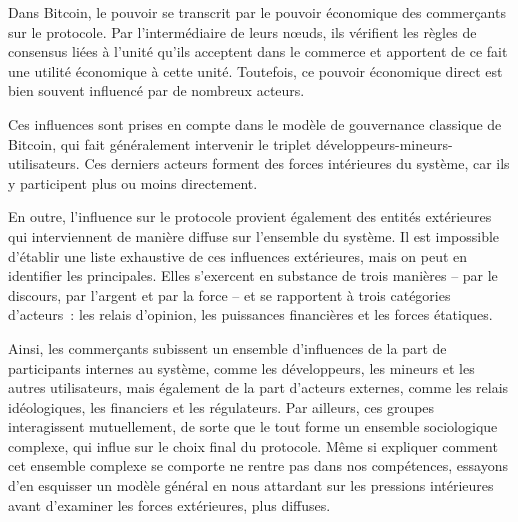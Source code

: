 Dans Bitcoin, le pouvoir se transcrit par le pouvoir économique des commerçants sur le protocole. Par l'intermédiaire de leurs nœuds, ils vérifient les règles de consensus liées à l'unité qu'ils acceptent dans le commerce et apportent de ce fait une utilité économique à cette unité. Toutefois, ce pouvoir économique direct est bien souvent influencé par de nombreux acteurs.

Ces influences sont prises en compte dans le modèle de gouvernance classique de Bitcoin, qui fait généralement intervenir le triplet développeurs-mineurs-utilisateurs. Ces derniers acteurs forment des forces intérieures du système, car ils y participent plus ou moins directement.

En outre, l'influence sur le protocole provient également des entités extérieures qui interviennent de manière diffuse sur l'ensemble du système. Il est impossible d'établir une liste exhaustive de ces influences extérieures, mais on peut en identifier les principales. Elles s'exercent en substance de trois manières -- par le discours, par l'argent et par la force -- et se rapportent à trois catégories d'acteurs~: les relais d'opinion, les puissances financières et les forces étatiques.

Ainsi, les commerçants subissent un ensemble d'influences de la part de participants internes au système, comme les développeurs, les mineurs et les autres utilisateurs, mais également de la part d'acteurs externes, comme les relais idéologiques, les financiers et les régulateurs. Par ailleurs, ces groupes interagissent mutuellement, de sorte que le tout forme un ensemble sociologique complexe, qui influe sur le choix final du protocole. Même si expliquer comment cet ensemble complexe se comporte ne rentre pas dans nos compétences, essayons d'en esquisser un modèle général en nous attardant sur les pressions intérieures avant d'examiner les forces extérieures, plus diffuses.


